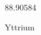 \documentclass[12pt]{article}
\begin{document}
\hfill{}
\vfill
\begin{center}
  {\fontsize{50}{60}
  }

  88.90584

Yttrium
\end{center}
\vfill
\end{document}
